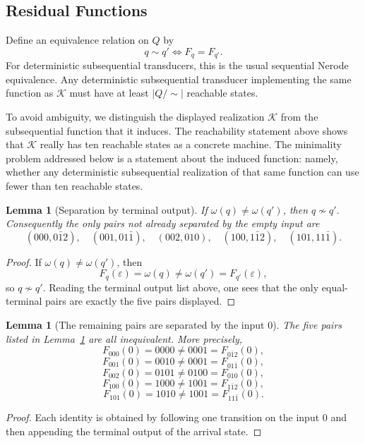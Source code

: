 \documentclass[11pt,letterpaper]{article}
\numberwithin{equation}{section}
\theoremstyle{plain}
\newtheorem{lemma}[theorem]{Lemma}
\theoremstyle{definition}
\theoremstyle{remark}
\begin{document}
\subsection{Residual Functions}

Define an equivalence relation on $Q$ by
\[
q\sim q' \iff F_q=F_{q'}.
\]
For deterministic subsequential transducers, this is the usual sequential
Nerode equivalence.  Any deterministic subsequential transducer implementing
the same function as $\mathcal K$ must have at least $|Q/\!\sim|$ reachable
states.

To avoid ambiguity, we distinguish the displayed realization $\mathcal K$ from
the subsequential function that it induces.  The reachability statement above
shows that $\mathcal K$ really has ten reachable states as a concrete machine.
The minimality problem addressed below is a statement about the induced
function: namely, whether any deterministic subsequential realization of that
same function can use fewer than ten reachable states.

\begin{lemma}[Separation by terminal output]\label{lem:terminal-separation}
If $\omega(q)\neq \omega(q')$, then $q\not\sim q'$.  Consequently the only
pairs not already separated by the empty input are
\[
(000,0\bar{1}2),\quad
(001,01\bar{1}),\quad
(002,010),\quad
(100,1\bar{1}2),\quad
(101,11\bar{1}).
\]
\end{lemma}

\begin{proof}
If $\omega(q)\neq \omega(q')$, then
\[
F_q(\varepsilon)=\omega(q)\neq \omega(q')=F_{q'}(\varepsilon),
\]
so $q\not\sim q'$.  Reading the terminal output list above, one sees that the
only equal-terminal pairs are exactly the five pairs displayed.
\end{proof}

\begin{lemma}[The remaining pairs are separated by the input $0$]\label{lem:zero-separation}
The five pairs listed in Lemma~\ref{lem:terminal-separation} are all
inequivalent.  More precisely,
\[
F_{000}(0)=0000 \neq 0001 = F_{0\bar{1}2}(0),
\]
\[
F_{001}(0)=0010 \neq 0001 = F_{01\bar{1}}(0),
\]
\[
F_{002}(0)=0101 \neq 0100 = F_{010}(0),
\]
\[
F_{100}(0)=1000 \neq 1001 = F_{1\bar{1}2}(0),
\]
\[
F_{101}(0)=1010 \neq 1001 = F_{11\bar{1}}(0).
\]
\end{lemma}

\begin{proof}
Each identity is obtained by following one transition on the input $0$ and
then appending the terminal output of the arrival state.
\end{proof}
\end{document}
